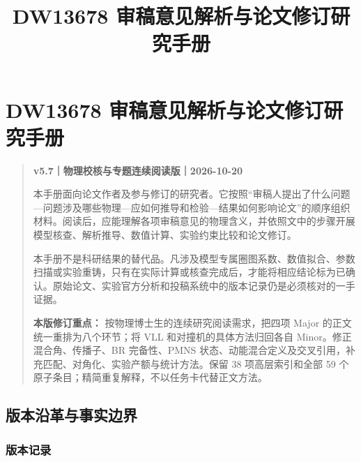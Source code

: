 \documentclass[
  chinese,
  UTF8]{ctexart}
\title{DW13678 审稿意见解析与论文修订研究手册}
\author{}
\date{}
\begin{document}
\maketitle

{
\setcounter{tocdepth}{3}
\tableofcontents
}
\section{DW13678
审稿意见解析与论文修订研究手册}\label{dw13678-ux5ba1ux7a3fux610fux89c1ux89e3ux6790ux4e0eux8bbaux6587ux4feeux8ba2ux7814ux7a76ux624bux518c}

\begin{quote}
\textbf{v5.7｜物理校核与专题连续阅读版｜2026-10-20}

本手册面向论文作者及参与修订的研究者。它按照``审稿人提出了什么问题---问题涉及哪些物理---应如何推导和检验---结果如何影响论文''的顺序组织材料。阅读后，应能理解各项审稿意见的物理含义，并依照文中的步骤开展模型核查、解析推导、数值计算、实验约束比较和论文修订。

本手册不是科研结果的替代品。凡涉及模型专属圈图系数、数值拟合、参数扫描或实验重铸，只有在实际计算或核查完成后，才能将相应结论标为已确认。原始论文、实验官方分析和投稿系统中的版本记录仍是必须核对的一手证据。

\textbf{本版修订重点：} 按物理博士生的连续研究阅读需求，把四项 Major
的正文统一重排为八个环节；将 VLL 和对撞机的具体方法归回各自
Minor。修正混合角、传播子、BR 完备性、PMNS
状态、动能混合定义及交叉引用，补充匹配、对角化、实验产额与统计方法。保留
38 项高层索引和全部 59
个原子条目；精简重复解释，不以任务卡代替正文方法。
\end{quote}

\subsection{版本沿革与事实边界}\label{ux7248ux672cux6cbfux9769ux4e0eux4e8bux5b9eux8fb9ux754c}

\subsubsection{版本记录}\label{ux7248ux672cux8bb0ux5f55}
\end{document}
